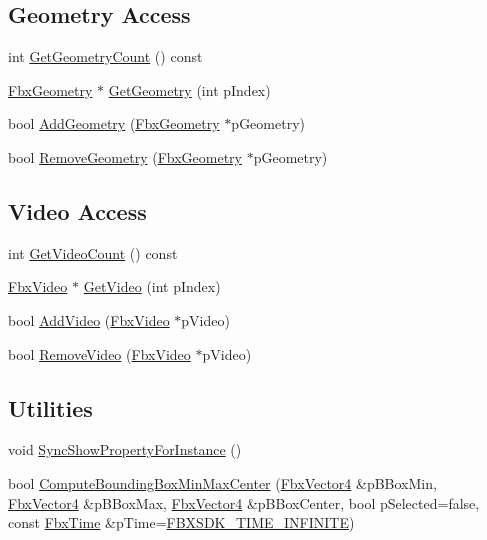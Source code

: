 \subsection*{Geometry Access}
\begin{DoxyCompactItemize}
\item 
int \hyperlink{class_fbx_scene_aab367e33255510f9a6db9b8b56efc873}{Get\+Geometry\+Count} () const
\item 
\hyperlink{class_fbx_geometry}{Fbx\+Geometry} $\ast$ \hyperlink{class_fbx_scene_a66fc27092b1511bc91bb8c73352b066c}{Get\+Geometry} (int p\+Index)
\item 
bool \hyperlink{class_fbx_scene_a43871135355dec7e9eb2070b93e61423}{Add\+Geometry} (\hyperlink{class_fbx_geometry}{Fbx\+Geometry} $\ast$p\+Geometry)
\item 
bool \hyperlink{class_fbx_scene_a9bbff92d4739c1a39489c8b9178e51b4}{Remove\+Geometry} (\hyperlink{class_fbx_geometry}{Fbx\+Geometry} $\ast$p\+Geometry)
\end{DoxyCompactItemize}
\subsection*{Video Access}
\begin{DoxyCompactItemize}
\item 
int \hyperlink{class_fbx_scene_a203455f2e5a9b3891cae6eb516e71b15}{Get\+Video\+Count} () const
\item 
\hyperlink{class_fbx_video}{Fbx\+Video} $\ast$ \hyperlink{class_fbx_scene_ae5365932948e9fe88b2323669a92d114}{Get\+Video} (int p\+Index)
\item 
bool \hyperlink{class_fbx_scene_ae71fcbb60eadb1ba418e210d8104cc54}{Add\+Video} (\hyperlink{class_fbx_video}{Fbx\+Video} $\ast$p\+Video)
\item 
bool \hyperlink{class_fbx_scene_aac60d3534072390ae951879dd92339ff}{Remove\+Video} (\hyperlink{class_fbx_video}{Fbx\+Video} $\ast$p\+Video)
\end{DoxyCompactItemize}
\subsection*{Utilities}
\begin{DoxyCompactItemize}
\item 
void \hyperlink{class_fbx_scene_a940444136913f6e50f687ff0807c93e5}{Sync\+Show\+Property\+For\+Instance} ()
\item 
bool \hyperlink{class_fbx_scene_aa7b8cd4fcbb1836fa40f68b55a29cc35}{Compute\+Bounding\+Box\+Min\+Max\+Center} (\hyperlink{class_fbx_vector4}{Fbx\+Vector4} \&p\+B\+Box\+Min, \hyperlink{class_fbx_vector4}{Fbx\+Vector4} \&p\+B\+Box\+Max, \hyperlink{class_fbx_vector4}{Fbx\+Vector4} \&p\+B\+Box\+Center, bool p\+Selected=false, const \hyperlink{class_fbx_time}{Fbx\+Time} \&p\+Time=\hyperlink{fbxtime_8h_a1e6db3fe0f84f0b7daa775739f93526f}{F\+B\+X\+S\+D\+K\+\_\+\+T\+I\+M\+E\+\_\+\+I\+N\+F\+I\+N\+I\+TE})
\end{DoxyCompactItemize}
